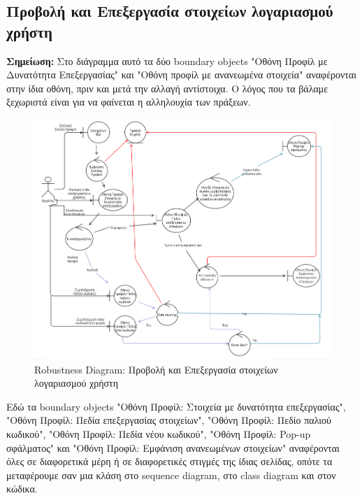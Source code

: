 \documentclass[12pt,a4paper]{article}
\begin{document}
\subsection{Προβολή και Επεξεργασία στοιχείων λογαριασμού χρήστη}
\textbf{Σημείωση:} Στο διάγραμμα αυτό τα δύο boundary objects "Οθόνη Προφίλ με Δυνατότητα Επεξεργασίας" και "Οθόνη προφίλ με ανανεωμένα στοιχεία" αναφέρονται στην ίδια οθόνη, πριν και μετά την αλλαγή αντίστοιχα. Ο λόγος που τα βάλαμε ξεχωριστά είναι για να φαίνεται η αλληλουχία των πράξεων.
\begin{figure}[H]
	\includegraphics[width=\textwidth]{View and Edit User Account Details Robustness.png}
	\caption{Robustness Diagram: Προβολή και Επεξεργασία στοιχείων λογαριασμού χρήστη}
	\label{Robustness Diagram: Προβολή και Επεξεργασία στοιχείων λογαριασμού χρήστη}
\end{figure}

Εδώ τα boundary objects "Οθόνη Προφίλ: Στοιχεία με δυνατότητα επεξεργασίας", "Οθόνη Προφίλ: Πεδία επεξεργασίας στοιχείων", "Οθόνη Προφίλ: Πεδίο παλιού κωδικού", "Οθόνη Προφίλ: Πεδία νέου κωδικού", "Οθόνη Προφίλ: Pop-up σφάλματος" και "Οθόνη Προφίλ: Εμφάνιση ανανεωμένων στοιχείων" αναφέρονται όλες σε διαφορετικά μέρη ή σε διαφορετικές στιγμές της ίδιας σελίδας, οπότε τα μεταφέρουμε σαν μια κλάση στο sequence diagram, στο class diagram και στον κώδικα.
\end{document}
